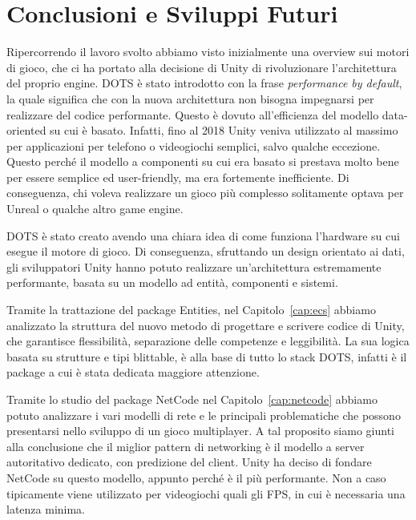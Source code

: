 \chapter*{Conclusioni e Sviluppi Futuri}

Ripercorrendo il lavoro svolto abbiamo visto inizialmente una overview sui motori di gioco, che ci ha portato alla decisione di Unity di rivoluzionare l'architettura del proprio engine. DOTS è stato introdotto con la frase \emph{performance by default}, la quale significa che con la nuova architettura non bisogna impegnarsi per realizzare del codice performante. Questo è dovuto all'efficienza del modello data-oriented su cui è basato.
Infatti, fino al 2018 Unity veniva utilizzato al massimo per applicazioni per telefono o videogiochi semplici, salvo qualche eccezione. Questo perché il modello a componenti su cui era basato si prestava molto bene per essere semplice ed user-friendly, ma era fortemente inefficiente. Di conseguenza, chi voleva realizzare un gioco più complesso solitamente optava per Unreal o qualche altro game engine.

DOTS è stato creato avendo una chiara idea di come funziona l'hardware su cui esegue il motore di gioco. Di conseguenza, sfruttando un design orientato ai dati, gli sviluppatori Unity hanno potuto realizzare un'architettura estremamente performante, basata su un modello ad entità, componenti e sistemi. 

Tramite la trattazione del package Entities, nel Capitolo~\ref{cap:ecs} abbiamo analizzato la struttura del nuovo metodo di progettare e scrivere codice di Unity, che garantisce flessibilità, separazione delle competenze e leggibilità. La sua logica basata su strutture e tipi blittable, è alla base di tutto lo stack DOTS, infatti è il package a cui è stata dedicata maggiore attenzione.

Tramite lo studio del package NetCode nel Capitolo~\ref{cap:netcode} abbiamo potuto analizzare i vari modelli di rete e le principali problematiche che possono presentarsi nello sviluppo di un gioco multiplayer. A tal proposito siamo giunti alla conclusione che il miglior pattern di networking è il modello a server autoritativo dedicato, con predizione del client. Unity ha deciso di fondare NetCode su questo modello, appunto perché è il più performante. Non a caso tipicamente viene utilizzato per videogiochi quali gli FPS, in cui è necessaria una latenza minima.

